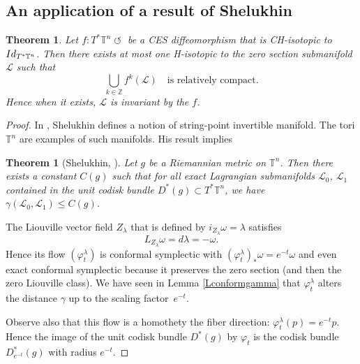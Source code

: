 \documentclass[11pt]{article}
\newcommand{\Subsection}{\subsection}
\numberwithin{equation}{section}
\numberwithin{figure}{section}
\numberwithin{table}{section}
\providecommand{\righttoleftarrow}{\mathrel{\circlearrowleft}}
\newtheorem{theorem}{Theorem}
\newtheorem*{theorem*}{Theorem}
\theoremstyle{definition}
\def\Z{\mathbb{Z}}
\def\T{\mathbb{T}}
\def\cL{{\mathcal L}}
\begin{document}
\Subsection{An application of a result of Shelukhin}

\begin{theorem}
Let $f:T^*\T^n \righttoleftarrow$ be a CES diffeomorphism that is CH-isotopic to ${\rm Id}_{T^*\T^n}$. Then there exists at most one H-isotopic to the zero section submanifold $\cL$ such that
\[
\bigcup_{k\in\Z}f^k(\cL)\quad\text{is relatively compact}.
\]
Hence when it exists, $\cL$ is invariant by the $f$.
\end{theorem}

\begin{proof}
In \cite{Shel2020}, Shelukhin defines a notion of string-point invertible manifold. The tori $\T^n$ are examples of such manifolds. His result implies
\begin{theorem*}[Shelukhin, \cite{Shel2020}] Let $g$ be a Riemannian metric
on $\T^n$. Then there exists a constant $C(g)$ such that for all exact Lagrangian submanifolds
$\cL_0$, $\cL_1$ contained in the unit codisk bundle $D^*(g)\subset T^*\T^n$, we have
$\gamma (\cL_0, \cL_1) \leq C(g)$.
\end{theorem*}

The Liouville vector field $Z_\lambda$ that is defined by $i_{Z_\lambda}\omega=\lambda$ satisfies
\[
L_{Z_\lambda}\omega=d\lambda=-\omega.
\]
Hence its flow $(\varphi^\lambda_t)$ is conformal symplectic with $(\varphi^\lambda_{t})_*\omega=e^{-t}\omega$ and even exact conformal symplectic because it preserves the zero section (and then the zero Liouville class). We have seen in Lemma \ref{Lconformgamma} that $\varphi^\lambda_t$ alters the distance $\gamma$ up to the scaling factor~$e^{-t}$.

Observe also that this flow is a homothety the fiber direction: $\varphi^\lambda_t(p)=e^{-t}p$. Hence the image of the unit codisk bundle $D^*(g)$ by $\varphi_t$ is the codisk bundle $D_{e^{-t}}^*(g)$ with radius $e^{-t}$.


\end{proof}
\end{document}
